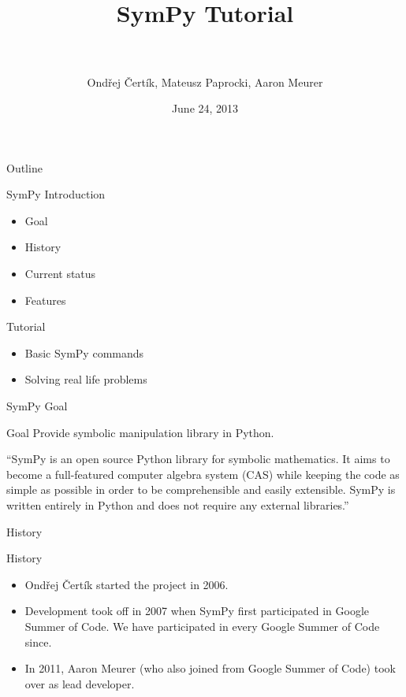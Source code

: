 \documentclass[xcolor=svgnames]{beamer}
\title[SymPy\hspace{4em}\insertframenumber/
\inserttotalframenumber]{~\\ SymPy Tutorial \\~}
\author[O. Čertík, M. Paprocki, A. Meurer]
{Ondřej Čertík, Mateusz Paprocki, Aaron Meurer}
\institute{\pgfuseimage{mylogo}}
\date{June 24, 2013}
\begin{document}
\begin{frame}
  \maketitle
\end{frame}

\begin{frame}{Outline}
  \begin{block}{SymPy Introduction}
    \begin{itemize}
    \item Goal
    \item History
    \item Current status
    \item Features
    \end{itemize}
  \end{block}

  \begin{block}{Tutorial}
    \begin{itemize}
    \item Basic SymPy commands
    \item Solving real life problems
    \end{itemize}
  \end{block}
\end{frame}

\begin{frame}{SymPy Goal}
  \begin{block}{Goal}
    Provide symbolic manipulation library in Python.
  \end{block}
  \pause
  \begin{block}

    ``SymPy is an open source Python library for symbolic mathematics. It aims to
    become a full-featured computer algebra system (CAS) while keeping the code as
    simple as possible in order to be comprehensible and easily extensible. SymPy
    is written entirely in Python and does not require any external libraries.''

  \end{block}
\end{frame}

\begin{frame}{History}
  \begin{block}{History}
    \begin{itemize}
    \item Ondřej Čertík started the project in 2006.
    \item Development took off in 2007 when SymPy first participated in Google
      Summer of Code. We have participated in every Google Summer of Code since.
    \item In 2011, Aaron Meurer (who also joined from Google Summer of Code) took
      over as lead developer.
    \end{itemize}
  \end{block}
\end{frame}
\end{document}
